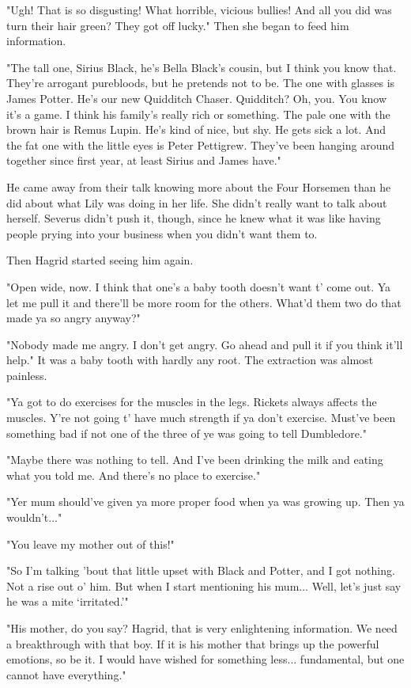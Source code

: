 "Ugh! That is so disgusting! What horrible, vicious bullies! And all you did was turn their hair green? They got off lucky." Then she began to feed him information.

"The tall one, Sirius Black, he's Bella Black's cousin, but I think you know that. They're arrogant purebloods, but he pretends not to be. The one with glasses is James Potter. He's our new Quidditch Chaser. Quidditch? Oh, you. You know it's a game. I think his family's really rich or something. The pale one with the brown hair is Remus Lupin. He's kind of nice, but shy. He gets sick a lot. And the fat one with the little eyes is Peter Pettigrew. They've been hanging around together since first year, at least Sirius and James have."

He came away from their talk knowing more about the Four Horsemen than he did about what Lily was doing in her life. She didn't really want to talk about herself. Severus didn't push it, though, since he knew what it was like having people prying into your business when you didn't want them to.

Then Hagrid started seeing him again.

"Open wide, now. I think that one's a baby tooth doesn't want t' come out. Ya let me pull it and there'll be more room for the others. What'd them two do that made ya so angry anyway?"

"Nobody made me angry. I don't get angry. Go ahead and pull it if you think it'll help." It was a baby tooth with hardly any root. The extraction was almost painless.

"Ya got to do exercises for the muscles in the legs. Rickets always affects the muscles. Y're not going t' have much strength if ya don't exercise. Must've been something bad if not one of the three of ye was going to tell Dumbledore."

"Maybe there was nothing to tell. And I've been drinking the milk and eating what you told me. And there's no place to exercise."

"Yer mum should've given ya more proper food when ya was growing up. Then ya wouldn't..."

"You leave my mother out of this!"

"So I'm talking 'bout that little upset with Black and Potter, and I got nothing. Not a rise out o' him. But when I start mentioning his mum... Well, let's just say he was a mite `irritated.'"

"His mother, do you say? Hagrid, that is very enlightening information. We need a breakthrough with that boy. If it is his mother that brings up the powerful emotions, so be it. I would have wished for something less... fundamental, but one cannot have everything."

